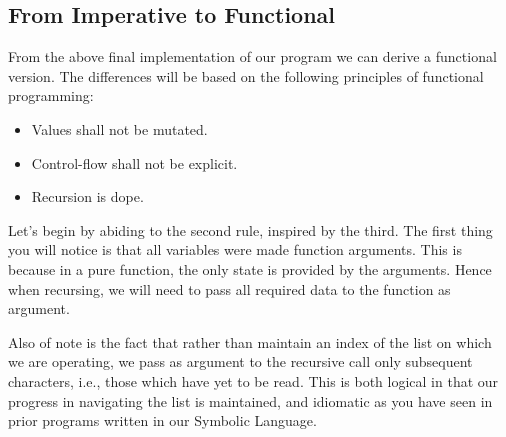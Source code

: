 \subsection{From Imperative to Functional}
From the above final implementation of our program we can derive a functional 
version. The differences will be based on the following principles of functional 
programming:

\begin{itemize}
  \item Values shall not be mutated.
  \item Control-flow shall not be explicit.
  \item Recursion is dope.
\end{itemize}

Let's begin by abiding to the second rule, inspired by the third. The first thing 
you will notice is that all variables were made function arguments. This is because 
in a pure function, the only state is provided by the arguments. Hence when 
recursing, we will need to pass all required data to the function as argument.

Also of note is the fact that rather than maintain an index of the list on which we 
are operating, we pass as argument to the recursive call only subsequent characters, 
i.e., those which have yet to be read. This is both logical in that our progress in 
navigating the list is maintained, and idiomatic as you have seen in prior programs 
written in our Symbolic Language.


